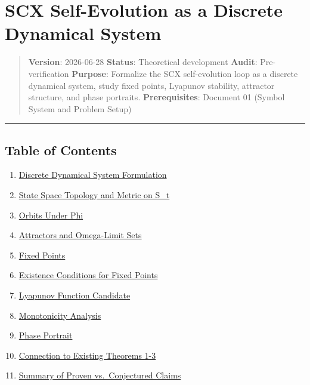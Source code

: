 \documentclass[
  12pt,
]{ctexart}
\author{SCX}
\date{2026}
\providecommand{\tightlist}{%
  \setlength{\itemsep}{0pt}\setlength{\parskip}{0pt}}
\begin{document}
\section{SCX Self-Evolution as a Discrete Dynamical
System}\label{scx-self-evolution-as-a-discrete-dynamical-system}

\begin{quote}
\textbf{Version}: 2026-06-28 \textbar{} \textbf{Status}: Theoretical
development \textbar{} \textbf{Audit}: Pre-verification
\textbf{Purpose}: Formalize the SCX self-evolution loop as a discrete
dynamical system, study fixed points, Lyapunov stability, attractor
structure, and phase portraits. \textbf{Prerequisites}: Document 01
(Symbol System and Problem Setup)
\end{quote}

\begin{center}\rule{0.5\linewidth}{0.5pt}\end{center}

\subsection{Table of Contents}\label{table-of-contents}

\begin{enumerate}
\def\labelenumi{\arabic{enumi}.}
\tightlist
\item
  \hyperref[1-discrete-dynamical-system-formulation]{Discrete Dynamical
  System Formulation}
\item
  \hyperref[2-state-space-topology-and-metric-on-s_t]{State Space
  Topology and Metric on S\_t}
\item
  \hyperref[3-orbits-under-phi]{Orbits Under Phi}
\item
  \hyperref[4-attractors-and-omega-limit-sets]{Attractors and
  Omega-Limit Sets}
\item
  \hyperref[5-fixed-points]{Fixed Points}
\item
  \hyperref[6-existence-conditions-for-fixed-points]{Existence
  Conditions for Fixed Points}
\item
  \hyperref[7-lyapunov-function-candidate]{Lyapunov Function Candidate}
\item
  \hyperref[8-monotonicity-analysis]{Monotonicity Analysis}
\item
  \hyperref[9-phase-portrait]{Phase Portrait}
\item
  \hyperref[10-connection-to-existing-theorems-1-3]{Connection to
  Existing Theorems 1-3}
\item
  \hyperref[11-summary-of-proven-vs-conjectured-claims]{Summary of
  Proven vs.~Conjectured Claims}
\end{enumerate}
\end{document}

